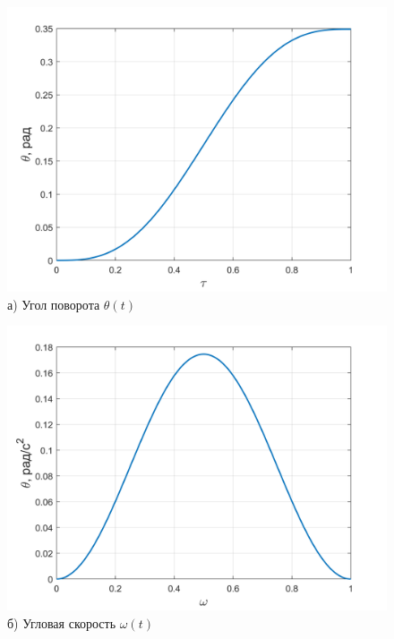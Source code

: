 \begin{figure}[h!]
	\begin{minipage}[b]{0.49\linewidth}\centering
		\includegraphics[width=\linewidth]{matlab/img/theta_sin} \\ а) Угол поворота $\theta(t)$
	\end{minipage}
	\hfill
	\begin{minipage}[b]{0.49\linewidth}\centering
		\includegraphics[width=\linewidth]{matlab/img/omega_sin} \\ б) Угловая скорость $\omega(t)$
	\end{minipage}
	
	\vspace{0.5em} %
	

\end{figure}
